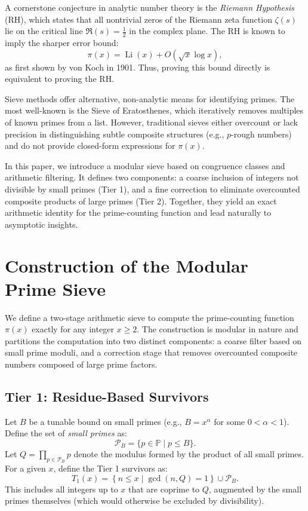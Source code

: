 \documentclass[11pt]{article}
\begin{document}
	A cornerstone conjecture in analytic number theory is the \textit{Riemann Hypothesis} (RH), which states that all nontrivial zeros of the Riemann zeta function $\zeta(s)$ lie on the critical line $\Re(s) = \frac{1}{2}$ in the complex plane. The RH is known to imply the sharper error bound:
	\[
	\pi(x) = \operatorname{Li}(x) + O\left(\sqrt{x} \log x\right),
	\]
	as first shown by von Koch in 1901. Thus, proving this bound directly is equivalent to proving the RH.
	
	Sieve methods offer alternative, non-analytic means for identifying primes. The most well-known is the Sieve of Eratosthenes, which iteratively removes multiples of known primes from a list. However, traditional sieves either overcount or lack precision in distinguishing subtle composite structures (e.g., $p$-rough numbers) and do not provide closed-form expressions for $\pi(x)$.
	
	In this paper, we introduce a modular sieve based on congruence classes and arithmetic filtering. It defines two components: a coarse inclusion of integers not divisible by small primes (Tier 1), and a fine correction to eliminate overcounted composite products of large primes (Tier 2). Together, they yield an exact arithmetic identity for the prime-counting function and lead naturally to asymptotic insights.
	
	
	\section{Construction of the Modular Prime Sieve}
	
	We define a two-stage arithmetic sieve to compute the prime-counting function $\pi(x)$ exactly for any integer $x \geq 2$. The construction is modular in nature and partitions the computation into two distinct components: a coarse filter based on small prime moduli, and a correction stage that removes overcounted composite numbers composed of large prime factors.
	
	\subsection{Tier 1: Residue-Based Survivors}
	
	Let $B$ be a tunable bound on small primes (e.g., $B = x^\alpha$ for some $0 < \alpha < 1$). Define the set of \textit{small primes} as:
	\[
	\mathcal{P}_B = \{p \in \mathbb{P} \mid p \leq B\}.
	\]
	Let $Q = \prod_{p \in \mathcal{P}_B} p$ denote the modulus formed by the product of all small primes. For a given $x$, define the Tier 1 survivors as:
	\[
	T_1(x) = \left\{ n \leq x \mid \gcd(n, Q) = 1 \right\} \cup \mathcal{P}_B.
	\]
	This includes all integers up to $x$ that are coprime to $Q$, augmented by the small primes themselves (which would otherwise be excluded by divisibility).
	
\end{document}
